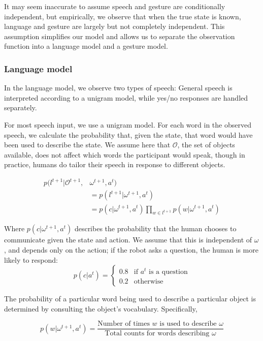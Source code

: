 \documentclass[letterpaper]{article}
\begin{document}
It may seem inaccurate to assume speech and gesture are conditionally independent, but empirically, we observe that when the true state is known, language and gesture are largely but not completely independent. This assumption simplifies our model and allows us to separate the observation function into a language model and a gesture model. 

\subsubsection{Language model}
In the language model, we observe two types of speech: General speech is interpreted according to a unigram model, while yes/no responses are handled separately. 

For most speech input, we use a unigram model. For each word in the observed speech, we calculate the probability that, given the state, that word would have been used to describe the state. We assume here that $\mathcal{O}$, the set of objects available, does not affect which words the participant would speak, though in practice, humans do tailor their speech in response to different objects. 

\begin{align*}
	p(l^{t+1}|\mathcal{O}^{t+1},&\omega^{t+1},a^t)\\
	&= p(l^{t+1}|\omega^{t+1},a^t)  \\
	&= p(c|\omega^{t+1}, a^t)\prod_{w \in l^{t+1}} p(w|\omega^{t+1},a^t)
\end{align*}


Where $p(c|\omega^{t+1},a^t)$ describes the probability that the human chooses to communicate given the state and action. We assume that this is independent of $\omega$, and depends only on the action; if the robot asks a question, the human is more likely to respond: 
\begin{equation}
	p(c|a^t) = \begin{cases}
		0.8 & \text{if $a^t$ is a question} \\
		0.2 & \text{otherwise}
	\end{cases}
\end{equation}

The probability of a particular word being used to describe a particular object is determined by consulting the object's vocabulary. Specifically, 

$$p(w|\omega^{t+1}, a^t) = \frac{\text{Number of times $w$ is used to describe $\omega$}}{ \text{Total counts for words describing $\omega$}}$$
\end{document}
